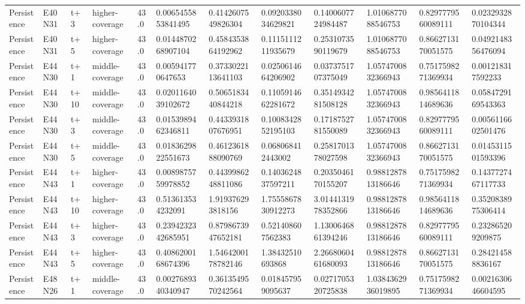 \begin{landscape}
\begin{longtable}{llllllllllll}
Persistence & E40N31 & t+3 & higher-coverage & 43.0 & 0.0065455853841495 & 0.4142607549826304 & 0.0920338034629821 & 0.1400607724984487 & 1.0106877088546753 & 0.8297779560089111 & 0.0232932870104344 \\
Persistence & E40N31 & t+5 & higher-coverage & 43.0 & 0.0144870268907104 & 0.4584353864192962 & 0.1115111211935679 & 0.2531073590119679 & 1.0106877088546753 & 0.8662713170051575 & 0.0492148356476094 \\
Persistence & E44N30 & t+1 & middle-coverage & 43.0 & 0.005941770647653 & 0.3733022113641103 & 0.0250614664206902 & 0.0373751707375049 & 1.0574700832366943 & 0.7517598271369934 & 0.001218317592233 \\
Persistence & E44N30 & t+10 & middle-coverage & 43.0 & 0.0201164039102672 & 0.5065183440844218 & 0.1105914662281672 & 0.3514934281508128 & 1.0574700832366943 & 0.9856411814689636 & 0.0584729169543363 \\
Persistence & E44N30 & t+3 & middle-coverage & 43.0 & 0.0153989462346811 & 0.4433931807676951 & 0.1008342852195103 & 0.1718752781550089 & 1.0574700832366943 & 0.8297779560089111 & 0.0056116602501476 \\
Persistence & E44N30 & t+5 & middle-coverage & 43.0 & 0.0183629822551673 & 0.4612361888090769 & 0.068068412443002 & 0.2581701378027598 & 1.0574700832366943 & 0.8662713170051575 & 0.0145311501593396 \\
Persistence & E44N43 & t+1 & higher-coverage & 43.0 & 0.0089875759978852 & 0.4439986248811086 & 0.1403624837597211 & 0.2035046170155207 & 0.9881287813186646 & 0.7517598271369934 & 0.1437727467117733 \\
Persistence & E44N43 & t+10 & higher-coverage & 43.0 & 0.513613534232091 & 1.919376293818156 & 1.7555867830912273 & 3.0144131978352866 & 0.9881287813186646 & 0.9856411814689636 & 0.3520838975306414 \\
Persistence & E44N43 & t+3 & higher-coverage & 43.0 & 0.2394232342685951 & 0.8798673947652181 & 0.521408607562383 & 1.1300646861394246 & 0.9881287813186646 & 0.8297779560089111 & 0.232865209209875 \\
Persistence & E44N43 & t+5 & higher-coverage & 43.0 & 0.4086200168674396 & 1.5464200178782146 & 1.38432510693868 & 2.2668060461680093 & 0.9881287813186646 & 0.8662713170051575 & 0.284214588836167 \\
Persistence & E48N26 & t+1 & middle-coverage & 43.0 & 0.0027689340340947 & 0.3613549570242564 & 0.018457959095637 & 0.0271705320725838 & 1.0384362936019895 & 0.7517598271369934 & 0.0021630646604595 \\

\end{longtable}
\end{landscape}
